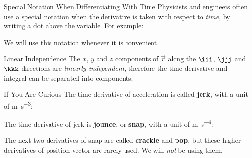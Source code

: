\documentclass[12pt,compress,aspectratio=169,dvipsnames]{beamer}
\begin{document}
\begin{frame}{Special Notation When Differentiating With Time}
  Physicists and engineers often use a special notation when the derivative is
  taken with respect to \emph{time}, by writing a dot above the variable. For
  example:


  We will use this notation whenever it is convenient
\end{frame}


\begin{frame}{Linear Independence}
  The $x$, $y$ and $z$ components of $\vec r$ along the $\iii$, $\jjj$ and
  $\kkk$ directions are \emph{linearly independent}, therefore the time
  derivative and integral can be separated into components:

\end{frame}



\begin{frame}{If You Are Curious}
  The time derivative of acceleration is called \textbf{jerk}, with a unit
  of \si{\metre\per\second\cubed}:


  The time derivative of jerk is \textbf{jounce}, or \textbf{snap}, with a
  unit of \si{\metre\per\second^4}:
  
  
  The next two derivatives of snap are called \textbf{crackle} and
  \textbf{pop}, but these higher derivatives of position vector are rarely used.
  We will \emph{not} be using them.
\end{frame}
\end{document}
